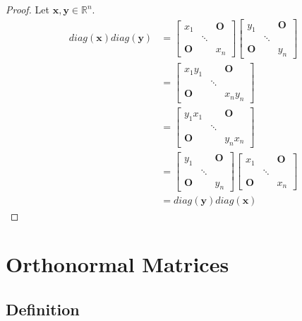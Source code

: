 \documentclass{article}
\theoremstyle{plain}
\begin{document}
\begin{proof}
	Let
	\begin{math}
		\bm{x} , \bm{y} \in \mathbb{R}^n .
	\end{math}
	\begin{equation*}
		\begin{split}
			diag(\bm{x}) diag(\bm{y}) &=
			\begin{bmatrix}
				x_1 &  & \bm{O} \\
				& \ddots & \\
				\bm{O} & & x_n
			\end{bmatrix}
			\begin{bmatrix}
				y_1 &  & \bm{O} \\
				& \ddots & \\
				\bm{O} & & y_n
			\end{bmatrix} \\
			&=
			\begin{bmatrix}
				x_1 y_1 &  & \bm{O} \\
				& \ddots & \\
				\bm{O} & & x_n y_n
			\end{bmatrix} \\
			&=
			\begin{bmatrix}
				y_1 x_1 &  & \bm{O} \\
				& \ddots & \\
				\bm{O} & & y_n x_n
			\end{bmatrix} \\
			&=
			\begin{bmatrix}
				y_1 &  & \bm{O} \\
				& \ddots & \\
				\bm{O} & & y_n
			\end{bmatrix}
			\begin{bmatrix}
				x_1 &  & \bm{O} \\
				& \ddots & \\
				\bm{O} & & x_n
			\end{bmatrix} \\
			&=
			diag(\bm{y}) diag(\bm{x})
		\end{split}
	\end{equation*}
\end{proof}


\section{Orthonormal Matrices}

\subsection{Definition}
\end{document}
